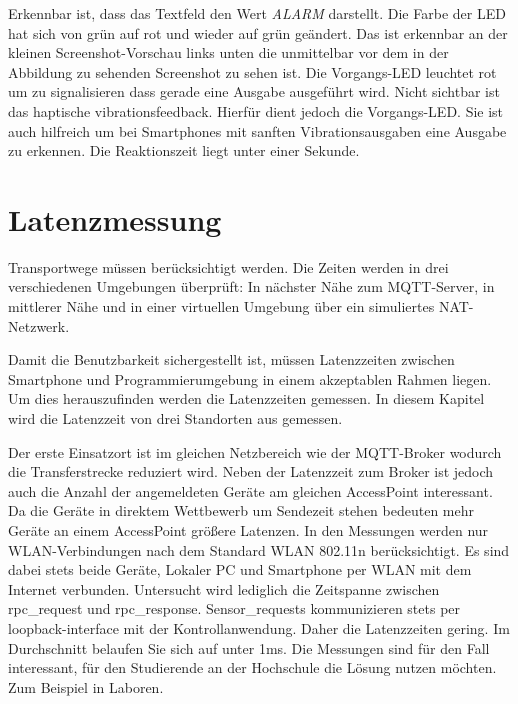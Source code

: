 \documentclass[11pt,a4paper]{report}
\begin{document}
Erkennbar ist, dass das Textfeld den Wert \textit{ALARM} darstellt.
Die Farbe der LED hat sich von grün auf rot und wieder auf grün geändert.
Das ist erkennbar an der kleinen Screenshot-Vorschau links unten die unmittelbar vor dem in der Abbildung zu sehenden Screenshot zu sehen ist.
Die Vorgangs-LED leuchtet rot um zu signalisieren dass gerade eine Ausgabe ausgeführt wird.
Nicht sichtbar ist das haptische vibrationsfeedback.
Hierfür dient jedoch die Vorgangs-LED.
Sie ist auch hilfreich um bei Smartphones mit sanften Vibrationsausgaben eine Ausgabe zu erkennen.
Die Reaktionszeit liegt unter einer Sekunde.

\section{Latenzmessung}

Transportwege müssen berücksichtigt werden.
Die Zeiten werden in drei verschiedenen Umgebungen überprüft: In nächster Nähe zum MQTT-Server, in mittlerer Nähe und in einer virtuellen Umgebung über ein simuliertes NAT-Netzwerk.

Damit die Benutzbarkeit sichergestellt ist, müssen Latenzzeiten zwischen Smartphone und Programmierumgebung in einem akzeptablen Rahmen liegen.
Um dies herauszufinden werden die Latenzzeiten gemessen.
In diesem Kapitel wird die Latenzzeit von drei Standorten aus gemessen.

Der erste Einsatzort ist im gleichen Netzbereich wie der MQTT-Broker wodurch die Transferstrecke reduziert wird.
Neben der Latenzzeit zum Broker ist jedoch auch die Anzahl der angemeldeten Geräte am gleichen AccessPoint interessant.
Da die Geräte in direktem Wettbewerb um Sendezeit stehen bedeuten mehr Geräte an einem AccessPoint größere Latenzen.
In den Messungen werden nur WLAN-Verbindungen nach dem Standard WLAN 802.11n berücksichtigt.
Es sind dabei stets beide Geräte, Lokaler PC und Smartphone per WLAN mit dem Internet verbunden.
Untersucht wird lediglich die Zeitspanne zwischen rpc\_request und rpc\_response.
Sensor\_requests kommunizieren stets per loopback-interface mit der Kontrollanwendung.
Daher die Latenzzeiten gering.
Im Durchschnitt belaufen Sie sich auf unter 1ms.
Die Messungen sind  für den Fall interessant, für den Studierende an der Hochschule die Lösung nutzen möchten.
Zum Beispiel in Laboren.
\end{document}
